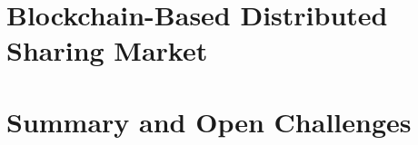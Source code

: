 \documentclass[11pt,a4paper,oneside,openright]{report}
\begin{document}
\chapter{Blockchain-Based Distributed Sharing Market}
\label{cpt:chapter_3}\acresetall%


\chapter{Summary and Open Challenges}
\label{cpt:conclusion}





\vfill
{} \label{cpt:acronyms}\acresetall
{}


%
%

\begin{singlespacing}
    \cleardoublepage\pagestyle{bibmine}%
    
    
\end{singlespacing}



\end{document}
